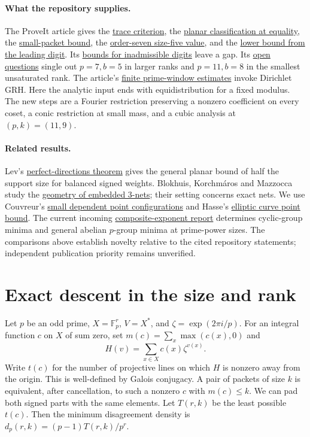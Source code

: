 \documentclass[11pt]{article}
\newcommand{\articlepath}{https://github.com/VladimirReshetnikov/ProveIt/blob/4f99495218d1a19087deabd8fb5bbb8f5df72a46/Analysis/GeneralizedRiemannHypothesis/Article/sections/rec.tex}
\newcommand{\reporef}[2]{\href{\articlepath\#L#1}{#2}}
\begin{document}
\paragraph{What the repository supplies.}
The ProveIt article gives the \reporef{4675}{trace criterion}, the \reporef{4785}{planar classification at equality}, the \reporef{4854}{small-packet bound}, the \reporef{4913}{order-seven size-five value}, and the \reporef{4926}{lower bound from the leading digit}. Its \reporef{4967}{bounds for inadmissible digits} leave a gap. Its \reporef{5321}{open questions} single out $p=7,b=5$ in larger ranks and $p=11,b=8$ in the smallest unsaturated rank. The article's \reporef{5197}{finite prime-window estimates} invoke Dirichlet GRH. Here the analytic input ends with equidistribution for a fixed modulus. The new steps are a Fourier restriction preserving a nonzero coefficient on every coset, a conic restriction at small mass, and a cubic analysis at $(p,k)=(11,9)$.

\paragraph{Related results.}
Lev's \href{https://math.haifa.ac.il/seva/Papers/UDinFp2.pdf}{perfect-directions theorem} gives the general planar bound of half the support size for balanced signed weights. Blokhuis, Korchm\'aros and Mazzocca study the \href{https://doi.org/10.1016/j.jcta.2010.11.007}{geometry of embedded 3-nets}; their setting concerns exact nets. We use Couvreur's \href{https://arxiv.org/abs/0905.2345}{small dependent point configurations} and Hasse's \href{https://geodesic.mathdoc.fr/item/JRAM_1936__175_149968/}{elliptic curve point bound}. The current incoming \href{https://github.com/VladimirReshetnikov/ProveIt/blob/4f99495218d1a19087deabd8fb5bbb8f5df72a46/Analysis/GeneralizedRiemannHypothesis/docs/incoming/euler_agreement_2026-11-27.zip}{composite-exponent report} determines cyclic-group minima and general abelian $p$-group minima at prime-power sizes. The comparisons above establish novelty relative to the cited repository statements; independent publication priority remains unverified.
\section{Exact descent in the size and rank}
Let $p$ be an odd prime, $X=\mathbb F_p^r$, $V=X^*$, and $\zeta=\exp(2\pi i/p)$. For an integral function $c$ on $X$ of sum zero, set $m(c)=\sum_x\max(c(x),0)$ and
\[
 H(v)=\sum_{x\in X}c(x)\zeta^{v(x)}.
\]
Write $t(c)$ for the number of projective lines on which $H$ is nonzero away from the origin. This is well-defined by Galois conjugacy. A pair of packets of size $k$ is equivalent, after cancellation, to such a nonzero $c$ with $m(c)\le k$. We can pad both signed parts with the same elements. Let $T(r,k)$ be the least possible $t(c)$. Then the minimum disagreement density is $d_p(r,k)=(p-1)T(r,k)/p^r$.
\end{document}
